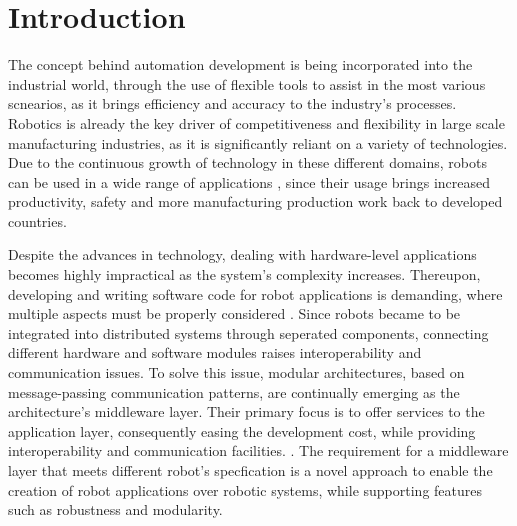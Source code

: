 \chapter{Introduction}\label{c:intro}

The concept behind automation development is being incorporated into the industrial world, through the use of flexible tools to assist in the most various scnearios, as it brings efficiency and accuracy to the industry's processes. Robotics is already the key driver of competitiveness and flexibility in large scale manufacturing industries, as it is significantly reliant on a variety of technologies. Due to the continuous growth of technology in these different domains, robots can be used in a wide range of applications \cite{mohamed2008middleware}, since their usage brings increased productivity, safety and more manufacturing production work back to developed countries. \cite{robots-importance, craig2005introduction}

Despite the advances in technology, dealing with hardware-level applications becomes highly impractical as the system's complexity increases. Thereupon, developing and writing software code for robot applications is demanding, where multiple aspects must be properly considered \cite{intro-ros}. Since robots became to be integrated into distributed systems through seperated components, connecting different hardware and software modules raises interoperability and communication issues. To solve this issue, modular architectures, based on message-passing communication patterns, are continually emerging as the architecture's middleware layer. Their primary focus is to offer services to the application layer, consequently easing the development cost, while providing interoperability and communication facilities. \cite{mohamed2008middleware, maruyama2016exploring}. The requirement for a middleware layer that meets different robot's specfication is a novel approach to enable the creation of robot applications over robotic systems, while supporting features such as robustness and modularity. 


